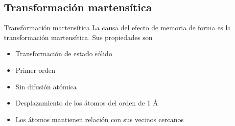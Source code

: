 \documentclass[11pt]{beamer}
\begin{document}
	\subsection{Transformación martensítica}
		\begin{frame}{Transformación martensítica}
			La causa del efecto de memoria de forma es la transformación martensítica.
			Sus propiedades son
			\begin{itemize}
				\item Transformación de estado sólido
				\item Primer orden
				\item Sin difusión atómica
				\item Desplazamiento de los átomos del orden de 1 \AA
				\item Los átomos mantienen relación con sus vecinos cercanos
			\end{itemize}
		\end{frame}
		
\end{document}
